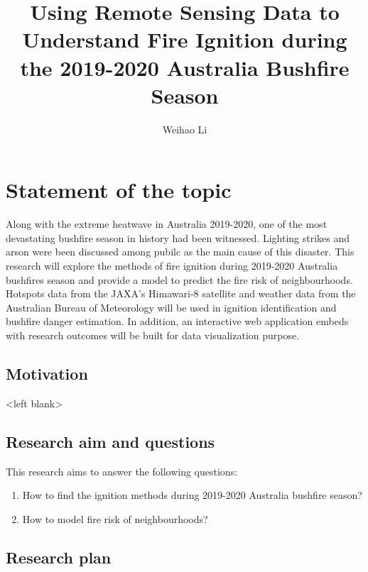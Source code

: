 \documentclass{monashthesis}
\author{Weihao Li}
\title{Using Remote Sensing Data to Understand Fire Ignition during the 2019-2020 Australia Bushfire Season}
\begin{document}

\titlepage

{\sf\tighttoc\doublespacing}

\clearpage{}\setcounter{page}{0}

\hypertarget{ch:intro}{%
\chapter{Statement of the topic}\label{ch:intro}}

Along with the extreme heatwave in Australia 2019-2020, one of the most devastating bushfire season in history had been witnessed. Lighting strikes and arson were been discussed among pubilc as the main cause of this disaster. This research will explore the methods of fire ignition during 2019-2020 Australia bushfires season and provide a model to predict the fire risk of neighbourhoods. Hotspots data from the JAXA's Himawari-8 satellite and weather data from the Australian Bureau of Meteorology will be used in ignition identification and bushfire danger estimation. In addition, an interactive web application embeds with research outcomes will be built for data visualization purpose.

\hypertarget{motivation}{%
\section{Motivation}\label{motivation}}

\textless left blank\textgreater{}

\hypertarget{research-aim-and-questions}{%
\section{Research aim and questions}\label{research-aim-and-questions}}

This research aims to answer the following questions:

\begin{enumerate}
\def\labelenumi{\arabic{enumi}.}
\tightlist
\item
  How to find the ignition methods during 2019-2020 Australia bushfire season?
\item
  How to model fire risk of neighbourhoods?
\end{enumerate}

\hypertarget{research-plan}{%
\section{Research plan}\label{research-plan}}
\end{document}
